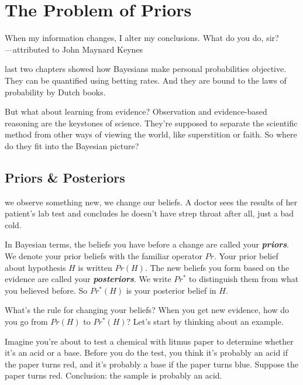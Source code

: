 \documentclass[justified]{tufte-book}
\newcommand{\p}{Pr}
\newcommand{\pr}{Pr}
\newcommand{\po}{Pr^*}
\newenvironment{epigraph}%
{
\begin{flushright}    
\begin{minipage}{20em}
\begin{flushright}
\itshape
}%
{
\end{flushright}
\end{minipage}
\end{flushright}
}
\theoremstyle{definition}
\theoremstyle{definition}
\theoremstyle{definition}
\theoremstyle{remark}
\begin{document}
\hypertarget{priors}{%
\chapter{The Problem of Priors}\label{priors}}

\begin{epigraph}
When my information changes, I alter my conclusions. What do you do,
sir?\\
---attributed to John Maynard Keynes
\end{epigraph}

 last two chapters showed how Bayesians make personal probabilities objective. They can be quantified using betting rates. And they are bound to the laws of probability by Dutch books.

But what about learning from evidence? Observation and evidence-based reasoning are the keystones of science. They're supposed to separate the scientific method from other ways of viewing the world, like superstition or faith. So where do they fit into the Bayesian picture?

\hypertarget{priors-posteriors}{%
\section{Priors \& Posteriors}\label{priors-posteriors}}

 we observe something new, we change our beliefs. A doctor sees the results of her patient's lab test and concludes he doesn't have strep throat after all, just a bad cold.

In Bayesian terms, the beliefs you have before a change are called your \textbf{\emph{priors}}. We denote your prior beliefs with the familiar operator \(\pr\). Your prior belief about hypothesis \(H\) is written \(\p(H)\). The new beliefs you form based on the evidence are called your \textbf{\emph{posteriors}}. We write \(\po\) to distinguish them from what you believed before. So \(\po(H)\) is your posterior belief in \(H\).

What's the rule for changing your beliefs? When you get new evidence, how do you go from \(\pr(H)\) to \(\po(H)\)? Let's start by thinking about an example.

Imagine you're about to test a chemical with litmus paper to determine whether it's an acid or a base. Before you do the test, you think it's probably an acid if the paper turns red, and it's probably a base if the paper turns blue. Suppose the paper turns red. Conclusion: the sample is probably an acid.
\end{document}
